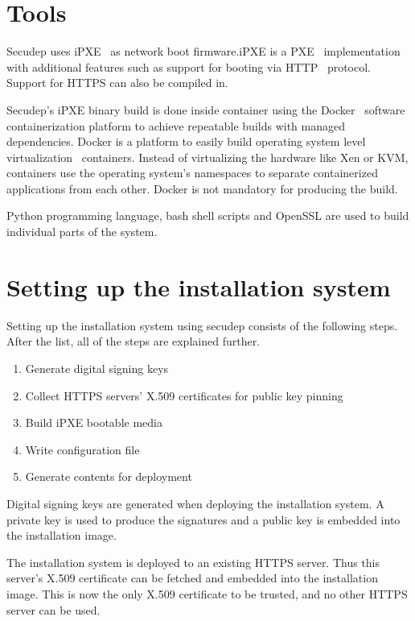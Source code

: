 \section{Tools}

Secudep uses iPXE~\cite{iPXE} as network boot firmware.\@ iPXE is a
PXE~\cite{PXEspec} implementation with additional features such as
support for booting via HTTP~\cite{RFC2616} protocol. Support for
HTTPS can also be compiled in.\@

Secudep's iPXE binary build is done inside container using the
Docker~\cite{Docker} software containerization platform to achieve
repeatable builds with managed dependencies. Docker is a platform to
easily build operating system level virtualization~\cite{Soltesz2007}
containers. Instead of virtualizing the hardware like Xen or KVM,
containers use the operating system's namespaces to separate
containerized applications from each other. Docker is not mandatory
for producing the build.

Python programming language, bash shell scripts and OpenSSL are used
to build individual parts of the system.

\section{Setting up the installation system}

Setting up the installation system using secudep consists of the
following steps. After the list, all of the steps are explained further.

\begin{enumerate}
  \item Generate digital signing keys
  \item Collect HTTPS servers' X.509 certificates for public key pinning
  \item Build iPXE bootable media
  \item Write configuration file
  \item Generate contents for deployment
\end{enumerate}

Digital signing keys are generated when deploying the installation
system. A private key is used to produce the signatures and a public
key is embedded into the installation image.

The installation system is deployed to an existing HTTPS server. Thus
this server's X.509 certificate can be fetched and embedded into the
installation image. This is now the only X.509 certificate to be
trusted, and no other HTTPS server can be used.

